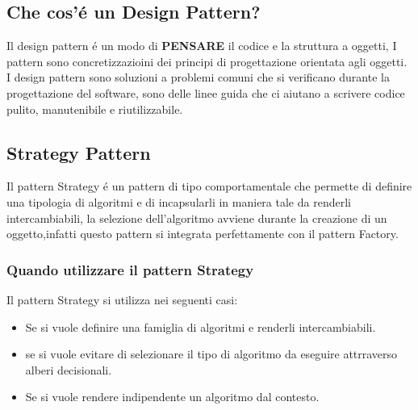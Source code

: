\documentclass[11pt]{article}
\begin{document}
\subsection{Che cos'é un Design Pattern?}
Il design pattern é un modo di \textbf{PENSARE} il codice e la struttura a oggetti, I pattern sono concretizzazioini dei principi di progettazione orientata agli oggetti.
I design pattern sono soluzioni a problemi comuni che si verificano durante la progettazione del software, sono delle linee guida che ci aiutano a scrivere codice pulito, manutenibile e riutilizzabile.
\subsection{Strategy Pattern}
Il pattern Strategy é un pattern di tipo comportamentale che permette di definire una tipologia di algoritmi
e di incapsularli in maniera tale da renderli intercambiabili, la selezione dell'algoritmo avviene durante la
creazione di un oggetto,infatti questo pattern si integrata perfettamente con il pattern Factory.
\subsubsection{Quando utilizzare il pattern Strategy}
Il pattern Strategy si utilizza nei seguenti casi:
\begin{itemize}
    \item Se si vuole definire una famiglia di algoritmi e renderli intercambiabili.
    \item se si vuole evitare di selezionare il tipo di algoritmo da eseguire attrraverso alberi decisionali.
    \item Se si vuole rendere indipendente un algoritmo dal contesto.
\end{itemize}
\end{document}
